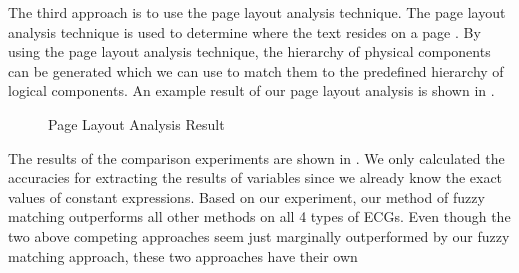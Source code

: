 The third approach is to use the page layout analysis technique. 
The page layout analysis technique is used to determine where the text 
resides on a page \cite{o1993document}. 
By using the page layout analysis technique, the hierarchy of physical components 
can be generated which we can use to match them to the predefined 
hierarchy of logical components. An example result of our page layout 
analysis is shown in .

\begin{figure}[ht]
\centering
{}
\caption{Page Layout Analysis Result}
\label{fig:pl}
\end{figure}

The results of the comparison experiments are shown in . 
We only calculated the accuracies for extracting the results of 
variables since we already know the exact values of constant 
expressions. Based on our experiment, our method of fuzzy matching 
outperforms all other methods on all 4 types of ECGs. 
Even though the two above competing approaches seem just marginally outperformed
by our fuzzy matching approach, these two approaches have their own 

